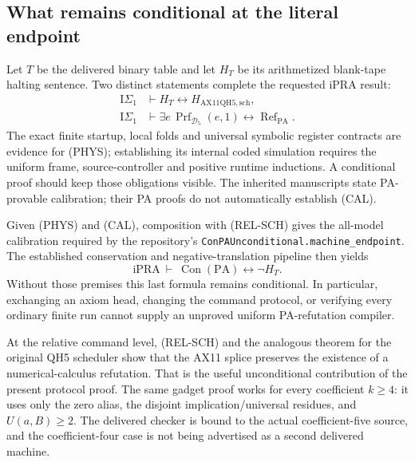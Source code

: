 \subsection{What remains conditional at the literal endpoint}

Let $T$ be the delivered binary table and let $H_T$ be its arithmetized
blank-tape halting sentence.  Two distinct statements complete the
requested iPRA result:
\begin{align*}
 \mathrm I\Sigma_1&\vdash H_T\leftrightarrow
                        H_{\mathrm{AX11QH5,sch}},\tag{PHYS}\\
 \mathrm I\Sigma_1&\vdash
  \exists e\,\operatorname{Prf}_{\mathcal D_5}(e,1)
       \leftrightarrow \operatorname{Ref}_{\mathrm{PA}}.\tag{CAL}
\end{align*}
The exact finite startup, local folds and universal symbolic register
contracts are evidence for (PHYS); establishing its internal coded
simulation requires the uniform frame, source-controller and positive
runtime inductions.  A conditional proof should keep those obligations
visible.  The inherited manuscripts state PA-provable calibration;
their PA proofs do not automatically establish (CAL).

Given (PHYS) and (CAL), composition with (REL-SCH) gives the all-model
calibration required by the repository's
\texttt{ConPAUnconditional.machine\_endpoint}.  The established
conservation and negative-translation pipeline then yields
\[
 \mathrm{iPRA}\ \vdash\
 \operatorname{Con}(\mathrm{PA})\leftrightarrow\neg H_T.
\]
Without those premises this last formula remains conditional.  In
particular, exchanging an axiom head, changing the command protocol,
or verifying every ordinary finite run cannot supply an unproved
uniform PA-refutation compiler.

At the relative command level, (REL-SCH) and the analogous theorem
for the original QH5 scheduler show that the AX11 splice preserves
the existence of a numerical-calculus refutation.  That is the useful
unconditional contribution of the present protocol proof.  The same
gadget proof works for every coefficient $k\geq4$: it uses only
the zero alias, the disjoint implication/universal residues, and
$U(a,B)\geq2$.  The delivered checker is bound to the actual
coefficient-five source, and the coefficient-four case is not
being advertised as a second delivered machine.

